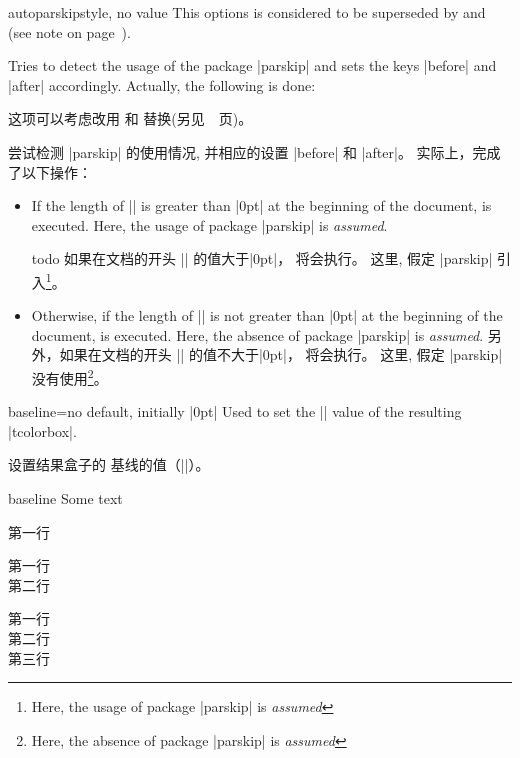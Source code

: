 \begin{docTcbKey}{autoparskip}{}{style, no value}
This options is considered to be superseded by
 and 
(see note on page~\pageref{subsec:surroundings}).\par
Tries to detect the usage of the package |parskip| and sets
the keys |before| and |after| accordingly. Actually, the following is done:

这项可以考虑改用  和  替换(另见~\pageref{subsec:surroundings}~页)。\par
尝试检测 |parskip| 的使用情况, 并相应的设置 |before| 和 |after|。 实际上，完成了以下操作：

\begin{itemize}
\item 
If the length of |\parskip| is greater than |0pt| at the beginning of the document,
 is executed. Here, the usage of package |parskip| is \emph{assumed}.

todo
如果在文档的开头 |\parskip| 的值大于|0pt|，%
 将会执行。 这里, 假定 |parskip| 引入\footnote{Here, the usage of package |parskip| is \emph{assumed}}。

\item 
Otherwise, if the length of |\parskip| is not greater than |0pt| at the beginning of the document,
 is executed. Here, the absence of package |parskip| is \emph{assumed}.
另外，如果在文档的开头 |\parskip| 的值不大于|0pt|，%
 将会执行。 这里, 假定 |parskip| 没有使用\footnote{Here, the absence of package |parskip| is \emph{assumed}}。
\end{itemize}
\end{docTcbKey}





\begin{docTcbKey}{baseline}{=}{no default, initially |0pt|}
Used to set the |\pgfsetbaseline| value of the resulting |tcolorbox|.

设置结果盒子的%
基线的值（|\pgfsetbaseline|）。

\begin{exdispExample}{baseline}
Some text\dotfill
\begin{tcolorbox}[baseline=3mm]
第一行
\end{tcolorbox}
\begin{tcolorbox}[baseline=3mm]
第一行\\第二行
\end{tcolorbox}
\begin{tcolorbox}[baseline=4mm]
第一行\\第二行\\第三行
\end{tcolorbox}
\end{exdispExample}
\end{docTcbKey}




